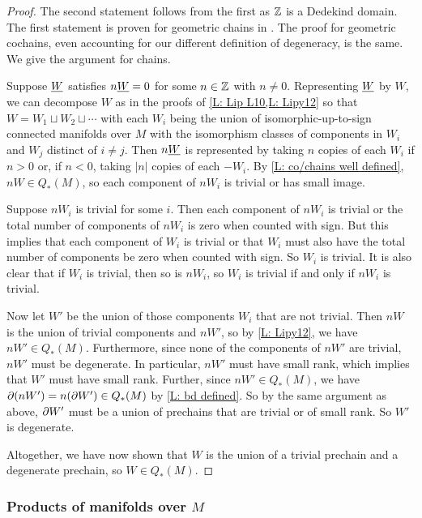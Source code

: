 \begin{proof}
	The second statement follows from the first as $\mathbb{Z}$ is a Dedekind domain.
	The first statement is proven for geometric chains in \cite[Lemma 34]{Lipy14}.
	The proof for geometric cochains, even accounting for our different definition of degeneracy, is the same.
	We give the argument for chains.

	Suppose $\underline{W}$ satisfies $n \underline{W} = 0$ for some $n \in \mathbb{Z}$ with $n \neq 0$.
	Representing $\underline{W}$ by $W$, we can decompose $W$ as in the proofs of \cref{L: Lip L10,L: Lipy12} so that $W = W_1 \sqcup W_2 \sqcup \cdots$ with each $W_i$ being the union of isomorphic-up-to-sign connected manifolds over $M$ with the isomorphism classes of components in $W_i$ and $W_j$ distinct of $i\neq j$.
	Then $n \underline{W}$ is represented by taking $n$ copies of each $W_i$ if $n > 0$ or, if $n < 0$, taking $|n|$ copies of each $-W_i$.
	By \cref{L: co/chains well defined}, $n W \in Q_*(M)$, so each component of $n W_i$ is trivial or has small image.

	Suppose $n W_i$ is trivial for some $i$.
	Then each component of $n W_i$ is trivial or the total number of components of $n W_i$ is zero when counted with sign.
	But this implies that each component of $W_i$ is trivial or that $W_i$ must also have the total number of components be zero when counted with sign.
	So $W_i$ is trivial.
	It is also clear that if $W_i$ is trivial, then so is $n W_i$, so $W_i$ is trivial if and only if $n W_i$ is trivial.

	Now let $W'$ be the union of those components $W_i$ that are not trivial.
	Then $nW$ is the union of trivial components and $n W'$, so by \cref{L: Lipy12}, we have $n W' \in Q_*(M)$.
	Furthermore, since none of the components of $n W'$ are trivial, $n W'$ must be degenerate.
	In particular, $n W'$ must have small rank, which implies that $W'$ must have small rank.
	Further, since $n W' \in Q_*(M)$, we have $\partial (n W') = n (\partial W') \in Q_*(M)$ by \cref{L: bd defined}.
	So by the same argument as above, $\partial W'$ must be a union of prechains that are trivial or of small rank.
	So $W'$ is degenerate.

	Altogether, we have now shown that $W$ is the union of a trivial prechain and a degenerate prechain, so $W \in Q_*(M)$.
\end{proof}

\subsubsection{Products of manifolds over \texorpdfstring{$M$}{M}}

